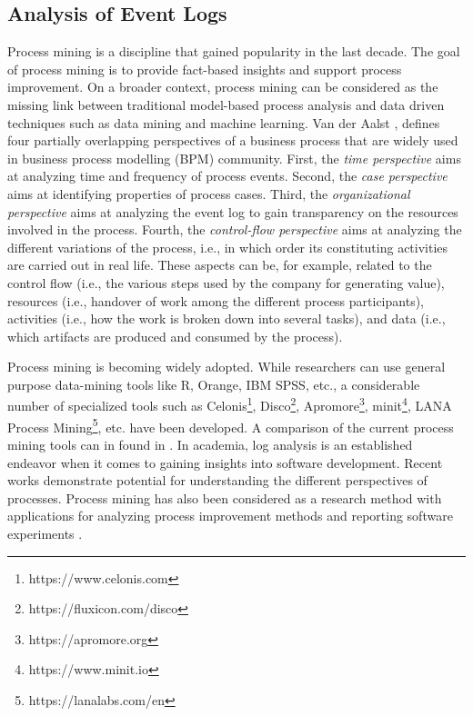 \subsection{Analysis of Event Logs}
\label{subsec:data-an-sota}

Process mining is a discipline that gained popularity in the last decade. The goal of process mining is to provide fact-based insights and support process improvement. On a broader context, process mining can be considered as the missing link between traditional model-based process analysis and data driven techniques such as data mining and machine learning. Van der Aalst \citep{DBLP:books/sp/Aalst16}, defines four partially overlapping perspectives of a business process that are widely used in business process modelling (BPM) community. First, the \emph{time perspective} aims at analyzing time and frequency of process events. Second, the \emph{case perspective} aims at identifying properties of process cases. Third, the \emph{organizational perspective} aims at analyzing the event log to gain transparency on the resources involved in the process. Fourth, the \emph{control-flow perspective} aims at analyzing the different variations of the process, i.e., in which order its constituting activities are carried out in real life. These aspects can be, for example, related to the control flow (i.e., the various steps used by the company for generating value), resources (i.e., handover of work among the different process participants), activities (i.e., how the work is broken down into several tasks), and data (i.e., which artifacts are produced and consumed by the process). 

Process mining is becoming widely adopted. While researchers can use general purpose data-mining tools like R, Orange, IBM SPSS, etc., a considerable number of specialized tools such as Celonis\footnote{https://www.celonis.com}, Disco\footnote{https://fluxicon.com/disco}, Apromore\footnote{https://apromore.org}, minit\footnote{https://www.minit.io}, LANA Process Mining\footnote{https://lanalabs.com/en}, etc. have been developed. A comparison of the current process mining tools can in found in \cite{viner2021process}. In academia, log analysis is an established endeavor when it comes to gaining insights into software development. Recent works
\citep{DBLP:conf/wecwis/MarquesSF18,DBLP:conf/bpm/BalaCMRP15,DBLP:conf/bpm/BalaRGBMS17,Bala2018b,DBLP:conf/ifip8-1/BalaKM20} demonstrate potential for understanding the different perspectives of processes. Process mining has also been considered as a research method \citep{DBLP:conf/hicss/GrisoldWMB20}  with applications for analyzing process improvement methods \citep{DBLP:conf/hicss/GrossMM19} and reporting software experiments \citep{DBLP:journals/ese/RevoredoDM21}.

